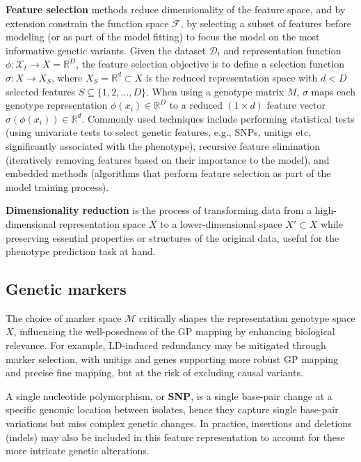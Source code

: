 \documentclass[12pt]{article}
\begin{document}
\textbf{Feature selection} methods reduce dimensionality of the feature space, and by extension constrain the function space $\mathcal{F}$, by selecting a subset of features before modeling (or as part of the model fitting) to focus the model on the most informative genetic variants. Given the dataset $\mathcal{D}_t$ and representation function $\phi: \mathcal{X}_t \to X=\mathbb{R}^D$, the feature selection objective is to define a selection function $\sigma: X \rightarrow X_S$, where $X_S = \mathbb{R}^d \subset X$ is the reduced representation space with $d<D$
selected features $S \subseteq \{1,2,\dots,D\}$. When using a genotype matrix $M$, $\sigma$ maps each genotype representation $\phi(x_i) \in \mathbb{R}^D$ to a reduced $(1\times d)$ feature vector $\sigma(\phi(x_i)) \in \mathbb{R}^d$. Commonly used techniques include performing statistical tests (using univariate tests to select genetic features, e.g., SNPs, unitigs etc, significantly associated with the phenotype), recursive feature elimination (iteratively removing features based on their importance to the model), and embedded methods (algorithms that perform feature selection as part of the model training process).

\textbf{Dimensionality reduction} is the process of transforming data from a high-dimensional representation space $X$ to a lower-dimensional space $X' \subset X$ while preserving essential properties or structures of the original data, useful for the phenotype prediction task at hand. 

\subsection{Genetic markers}

The choice of marker space $\mathcal{M}$ critically shapes the representation genotype space $X$, influencing the well-posedness of the GP mapping by enhancing biological relevance. For example, LD-induced redundancy may be mitigated through marker selection, with unitigs and genes supporting more robust GP mapping and precise fine mapping, but at the risk of excluding causal variants.


A single nucleotide polymorphism, or \textbf{SNP}, is a single base-pair change at a specific genomic location between isolates, hence they capture single base-pair variations but miss complex genetic changes. In practice, insertions and deletions (indels) may also be included in this feature representation to account for these more intricate genetic alterations.
\end{document}
